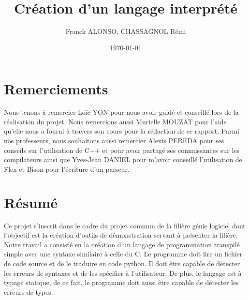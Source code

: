 \documentclass[a4paper]{article}%
\title{Création d'un langage interprété}
\author{Franck ALONSO, CHASSAGNOL Rémi}
\date{\today}
\begin{document}

\clearpage{}

\section{Remerciements}

\doublespacing
\large %

Nous tenons à remercier Loïc YON pour nous avoir guidé et conseillé lors de la
réalisation du projet. Nous remercions aussi Murielle MOUZAT pour l'aide qu'elle
nous a fourni à travers son cours pour la rédaction de ce rapport. Parmi nos
professeurs, nous souhaitons aussi remercier Alexis PEREDA pour ses conseils sur
l'utilisation de C++ et pour avoir partagé ses connaissances sur les
compilateurs ainsi que Yves-Jean DANIEL pour m'avoir conseillé l'utilisation de
Flex et Bison pour l'écriture d'un parseur.

\normalsize
\onehalfspacing

\clearpage{}

\thispagestyle{empty}
\tableofcontents
\clearpage{}

\listoffigures
\clearpage{}


\section{Résumé}

Ce projet s'inscrit dans le cadre du projet commun de la filière génie logiciel
dont l'objectif est la création d'outils de démonstration servant à présenter la
filière. Notre travail a consisté en la création d'un langage de programmation
transpilé simple avec une syntaxe similaire à celle du C. Le programme doit lire
un fichier de code source et de le traduire en code python. Il doit être capable
de détecter les erreurs de syntaxes et de les spécifier à l'utilisateur. De
plus, le langage est à typage statique, de ce fait, le programme doit aussi être
capable de détecter les erreurs de types.\\
\end{document}
